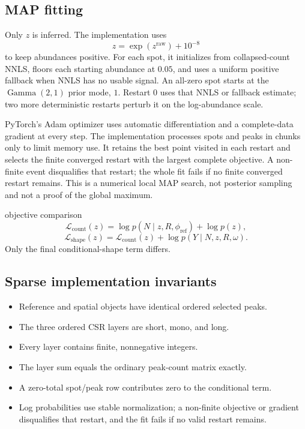 \documentclass[11pt]{article}
\newcommand{\Gam}{\operatorname{Gamma}}
\begin{document}
\subsection{MAP fitting}

Only \(z\) is inferred. The implementation uses
\[
z=\exp(z^{\mathrm{raw}})+10^{-8}
\]
to keep abundances positive. For each spot, it initializes from collapsed-count
NNLS, floors each starting abundance at \(0.05\), and uses a uniform positive
fallback when NNLS has no usable signal. An all-zero spot starts at the
\(\Gam(2,1)\) prior mode, \(1\). Restart 0 uses that NNLS or fallback estimate;
two more deterministic restarts perturb it on the log-abundance scale.

PyTorch's Adam optimizer uses automatic differentiation and a complete-data
gradient at every step. The implementation processes spots and peaks in chunks
only to limit memory use. It retains the best point visited in each restart and
selects the finite converged restart with the largest complete objective. A
non-finite event disqualifies that restart; the whole fit fails if no finite
converged restart remains. This is a numerical local MAP search, not posterior
sampling and not a proof of the global maximum.

\begin{advanced}{objective comparison}
\[
\mathcal L_{\mathrm{count}}(z)
=
\log p(N\mid z,R,\phi_{\mathrm{ref}})
+\log p(z),
\]
\[
\mathcal L_{\mathrm{shape}}(z)
=
\mathcal L_{\mathrm{count}}(z)
+\log p(Y\mid N,z,R,\omega).
\]
Only the final conditional-shape term differs.
\end{advanced}

\subsection{Sparse implementation invariants}

\begin{itemize}[leftmargin=2em]
  \item Reference and spatial objects have identical ordered selected peaks.
  \item The three ordered CSR layers are short, mono, and long.
  \item Every layer contains finite, nonnegative integers.
  \item The layer sum equals the ordinary peak-count matrix exactly.
  \item A zero-total spot/peak row contributes zero to the conditional term.
  \item Log probabilities use stable normalization; a non-finite objective or
  gradient disqualifies that restart, and the fit fails if no valid restart remains.
\end{itemize}
\end{document}
